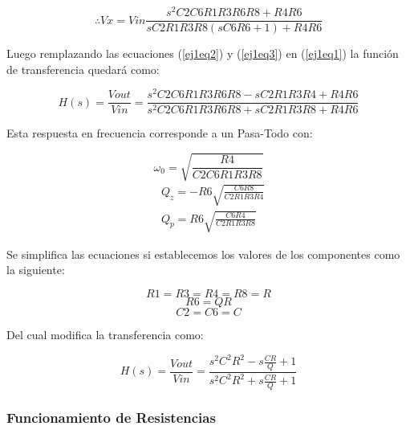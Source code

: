 \begin{equation}
    \therefore Vx = Vin\frac{s^2C2C6R1R3R6R8 + R4R6}{sC2R1R3R8(sC6R6 + 1) + R4R6}
    \label{ej1eq3}
\end{equation}

Luego remplazando las ecuaciones (\ref{ej1eq2}) y (\ref{ej1eq3}) en (\ref{ej1eq1}) la función de transferencia quedará como:

\begin{equation}
    H(s) = \frac{Vout}{Vin} = \frac{s^2C2C6R1R3R6R8 - sC2R1R3R4 + R4R6}{s^2C2C6R1R3R6R8 + sC2R1R3R8 + R4R6}
    \label{ej1eq4}
\end{equation}

Esta respuesta en frecuencia corresponde a un Pasa-Todo con:

\begin{equation}
\label{ej1eq5}
    \omega_0 = \sqrt{\frac{R4}{C2C6R1R3R8}}
\end{equation}
\begin{equation}
\begin{split}
\label{ej1eq6}
    &Q_z = -R6 \sqrt{\frac{C6R8}{C2R1R3R4}} \\
    &Q_p = R6 \sqrt{\frac{C6R4}{C2R1R3R8}}    
\end{split}
\end{equation}

Se simplifica las ecuaciones si establecemos los valores de los componentes como la siguiente:

$$R1 = R3 = R4 = R8 = R$$
$$R6 = Q  R $$
$$C2 = C6 = C$$

Del cual modifica la transferencia como:

\begin{equation}
    \label{ej1eq7}
     H(s) = \frac{Vout}{Vin} = \frac{s^2C^2R^2 - s\frac{CR}{Q} + 1}{s^2C^2R^2 + s\frac{CR}{Q} + 1}
\end{equation}

\subsubsection{Funcionamiento de Resistencias}

